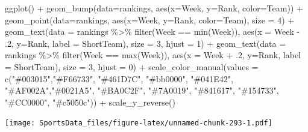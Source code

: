 \documentclass[
]{book}
\newenvironment{Shaded}{\begin{snugshade}}{\end{snugshade}}
\newcommand{\AttributeTok}[1]{\textcolor[rgb]{0.77,0.63,0.00}{#1}}
\newcommand{\DecValTok}[1]{\textcolor[rgb]{0.00,0.00,0.81}{#1}}
\newcommand{\FunctionTok}[1]{\textcolor[rgb]{0.00,0.00,0.00}{#1}}
\newcommand{\NormalTok}[1]{#1}
\newcommand{\SpecialCharTok}[1]{\textcolor[rgb]{0.00,0.00,0.00}{#1}}
\newcommand{\StringTok}[1]{\textcolor[rgb]{0.31,0.60,0.02}{#1}}
\begin{document}
\begin{Shaded}
\begin{Highlighting}[]
\FunctionTok{ggplot}\NormalTok{() }\SpecialCharTok{+} 
  \FunctionTok{geom\_bump}\NormalTok{(}\AttributeTok{data=}\NormalTok{rankings, }\FunctionTok{aes}\NormalTok{(}\AttributeTok{x=}\NormalTok{Week, }\AttributeTok{y=}\NormalTok{Rank, }\AttributeTok{color=}\NormalTok{Team)) }\SpecialCharTok{+} 
  \FunctionTok{geom\_point}\NormalTok{(}\AttributeTok{data=}\NormalTok{rankings, }\FunctionTok{aes}\NormalTok{(}\AttributeTok{x=}\NormalTok{Week, }\AttributeTok{y=}\NormalTok{Rank, }\AttributeTok{color=}\NormalTok{Team), }\AttributeTok{size =} \DecValTok{4}\NormalTok{) }\SpecialCharTok{+}   
  \FunctionTok{geom\_text}\NormalTok{(}\AttributeTok{data =}\NormalTok{ rankings }\SpecialCharTok{\%\textgreater{}\%} \FunctionTok{filter}\NormalTok{(Week }\SpecialCharTok{==} \FunctionTok{min}\NormalTok{(Week)), }\FunctionTok{aes}\NormalTok{(}\AttributeTok{x =}\NormalTok{ Week }\SpecialCharTok{{-}}\NormalTok{ .}\DecValTok{2}\NormalTok{, }\AttributeTok{y=}\NormalTok{Rank, }\AttributeTok{label =}\NormalTok{ ShortTeam), }\AttributeTok{size =} \DecValTok{3}\NormalTok{, }\AttributeTok{hjust =} \DecValTok{1}\NormalTok{) }\SpecialCharTok{+}
  \FunctionTok{geom\_text}\NormalTok{(}\AttributeTok{data =}\NormalTok{ rankings }\SpecialCharTok{\%\textgreater{}\%} \FunctionTok{filter}\NormalTok{(Week }\SpecialCharTok{==} \FunctionTok{max}\NormalTok{(Week)), }\FunctionTok{aes}\NormalTok{(}\AttributeTok{x =}\NormalTok{ Week }\SpecialCharTok{+}\NormalTok{ .}\DecValTok{2}\NormalTok{, }\AttributeTok{y=}\NormalTok{Rank, }\AttributeTok{label =}\NormalTok{ ShortTeam), }\AttributeTok{size =} \DecValTok{3}\NormalTok{, }\AttributeTok{hjust =} \DecValTok{0}\NormalTok{) }\SpecialCharTok{+}
  \FunctionTok{scale\_color\_manual}\NormalTok{(}\AttributeTok{values =} \FunctionTok{c}\NormalTok{(}\StringTok{"\#003015"}\NormalTok{,}\StringTok{"\#F66733"}\NormalTok{, }\StringTok{"\#461D7C"}\NormalTok{, }\StringTok{"\#bb0000"}\NormalTok{, }\StringTok{"\#041E42"}\NormalTok{, }\StringTok{"\#AF002A"}\NormalTok{,}\StringTok{"\#0021A5"}\NormalTok{, }\StringTok{"\#BA0C2F"}\NormalTok{, }\StringTok{"\#7A0019"}\NormalTok{, }\StringTok{"\#841617"}\NormalTok{, }\StringTok{"\#154733"}\NormalTok{, }\StringTok{"\#CC0000"}\NormalTok{, }\StringTok{"\#c5050c"}\NormalTok{)) }\SpecialCharTok{+}
  \FunctionTok{scale\_y\_reverse}\NormalTok{() }
\end{Highlighting}
\end{Shaded}

\texttt{[image: SportsData\_files/figure-latex/unnamed-chunk-293-1.pdf]}
\end{document}
